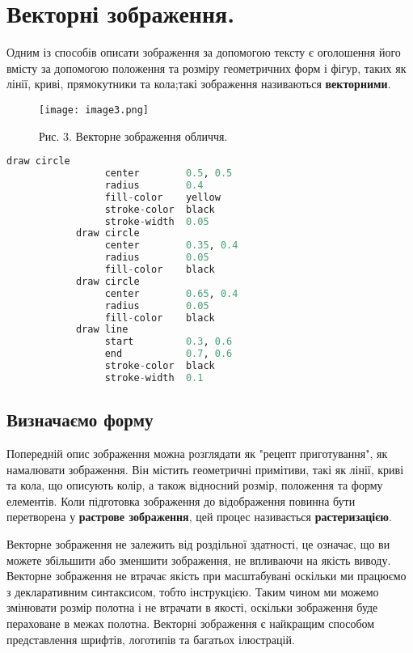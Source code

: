 \chapter{Векторні зображення.}\label{cha:vector_images}
Одним із способів описати зображення за допомогою тексту є оголошення його вмісту за допомогою положення та розміру геометричних форм і фігур, таких як лінії, криві, прямокутники та кола;такі зображення називаються \textbf{векторними}.

\begin{figure}
    \label{fig:image3}
    \centering
    \texttt{[image: image3.png]}

    Рис. 3. Векторне зображення обличчя.
\end{figure}

\begin{lstlisting}[style=light, language=Python,label={lst:vectorimg},caption=Приклад векторного зображення]
            draw circle
                 center        0.5, 0.5
                 radius        0.4
                 fill-color    yellow
                 stroke-color  black
                 stroke-width  0.05
            draw circle
                 center        0.35, 0.4
                 radius        0.05
                 fill-color    black
            draw circle
                 center        0.65, 0.4
                 radius        0.05
                 fill-color    black
            draw line
                 start         0.3, 0.6
                 end           0.7, 0.6
                 stroke-color  black
                 stroke-width  0.1
\end{lstlisting}

\section{Визначаємо форму}\label{sec:defining_shapes}

Попередній опис зображення можна розглядати як "рецепт приготування", як намалювати зображення.
Він містить геометричні примітиви, такі як лінії, криві та кола, що описують колір, а також відносний розмір, положення та форму елементів.
Коли підготовка зображення до відображення повинна бути перетворена у \textbf{растрове зображення}, цей процес називається \textbf{растеризацією}.

Векторне зображення не залежить від роздільної здатності, це означає, що ви можете збільшити або зменшити зображення, не впливаючи на якість виводу.
Векторне зображення не втрачає якість при масштабувані оскільки ми працюємо з декларативним синтаксисом, тобто інструкцією.
Таким чином ми можемо змінювати розмір полотна і не втрачати в якості, оскільки зображення буде пераховане в межах полотна.
Векторні зображення є найкращим способом представлення шрифтів, логотипів та багатьох ілюстрацій.
